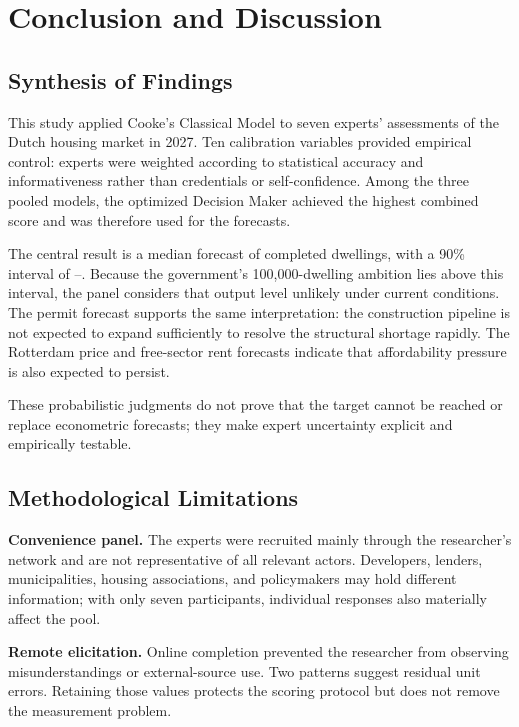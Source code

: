 \chapter{Conclusion and Discussion}
\label{chapter:conclusion_discussion}

\section{Synthesis of Findings}
\label{sec:synthesis}

This study applied Cooke's Classical Model to seven experts' assessments of the Dutch housing market in 2027. Ten calibration variables provided empirical control: experts were weighted according to statistical accuracy and informativeness rather than credentials or self-confidence. Among the three pooled models, the optimized Decision Maker achieved the highest combined score and was therefore used for the forecasts.

The central result is a median forecast of \DwellingsMedian{} completed dwellings, with a 90\% interval of \DwellingsFive{}--\DwellingsNinetyFive{}. Because the government's 100,000-dwelling ambition lies above this interval, the panel considers that output level unlikely under current conditions. The permit forecast supports the same interpretation: the construction pipeline is not expected to expand sufficiently to resolve the structural shortage rapidly. The Rotterdam price and free-sector rent forecasts indicate that affordability pressure is also expected to persist.

These probabilistic judgments do not prove that the target cannot be reached or replace econometric forecasts; they make expert uncertainty explicit and empirically testable.

\section{Methodological Limitations}
\label{sec:limitations}

\textbf{Convenience panel.} The experts were recruited mainly through the researcher's network and are not representative of all relevant actors. Developers, lenders, municipalities, housing associations, and policymakers may hold different information; with only seven participants, individual responses also materially affect the pool.

\textbf{Remote elicitation.} Online completion prevented the researcher from observing misunderstandings or external-source use. Two patterns suggest residual unit errors. Retaining those values protects the scoring protocol but does not remove the measurement problem.

